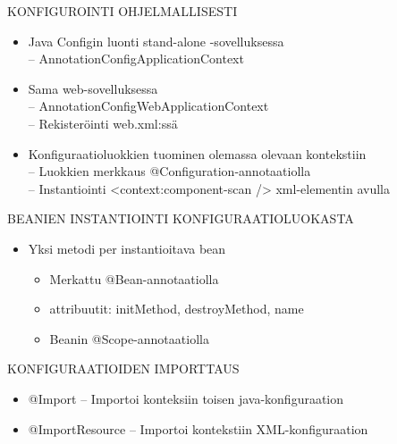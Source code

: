 \documentclass[hyperref={pdfauthor=\AUTHOR},14pt]{beamer}
\begin{document}
\begin{frame}[t, fragile]{KONFIGUROINTI OHJELMALLISESTI}
\begin{itemize}
 \item Java Configin luonti stand-alone -sovelluksessa\\
 -- AnnotationConfigApplicationContext
 \item Sama web-sovelluksessa\\
 -- AnnotationConfigWebApplicationContext\\
 -- Rekisteröinti web.xml:ssä\\
 \item Konfiguraatioluokkien tuominen olemassa olevaan kontekstiin\\
 -- Luokkien merkkaus @Configuration-annotaatiolla\\
 -- Instantiointi <context:component-scan /> xml-elementin avulla\\
\end{itemize}
\end{frame}
\begin{frame}[t, fragile]{BEANIEN INSTANTIOINTI KONFIGURAATIOLUOKASTA}
\begin{itemize}
\item Yksi metodi per instantioitava bean
\begin{itemize}
\item Merkattu @Bean-annotaatiolla
\item attribuutit: initMethod, destroyMethod, name
\item Beanin @Scope-annotaatiolla
\end{itemize}
\end{itemize}
\end{frame}
\begin{frame}[t, fragile]{KONFIGURAATIOIDEN IMPORTTAUS}
\begin{itemize}
 \item @Import
 -- Importoi konteksiin toisen java-konfiguraation
 \item @ImportResource
 -- Importoi kontekstiin XML-konfiguraation
\end{itemize}
\end{frame}
\end{document}
